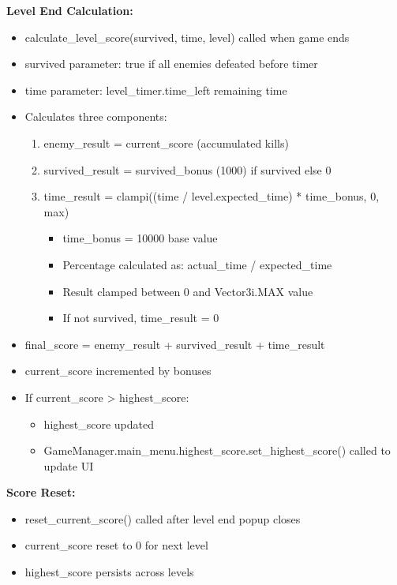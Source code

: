 \documentclass{article}
\begin{document}
\textbf{Level End Calculation:}
\begin{itemize}
    \item calculate\_level\_score(survived, time, level) called when game ends
    \item survived parameter: true if all enemies defeated before timer
    \item time parameter: level\_timer.time\_left remaining time
    \item Calculates three components:
    \begin{enumerate}
        \item enemy\_result = current\_score (accumulated kills)
        \item survived\_result = survived\_bonus (1000) if survived else 0
        \item time\_result = clampi((time / level.expected\_time) * time\_bonus, 0, max)
        \begin{itemize}
            \item time\_bonus = 10000 base value
            \item Percentage calculated as: actual\_time / expected\_time
            \item Result clamped between 0 and Vector3i.MAX value
            \item If not survived, time\_result = 0
        \end{itemize}
    \end{enumerate}
    \item final\_score = enemy\_result + survived\_result + time\_result
    \item current\_score incremented by bonuses
    \item If current\_score > highest\_score:
    \begin{itemize}
        \item highest\_score updated
        \item GameManager.main\_menu.highest\_score.set\_highest\_score() called to update UI
    \end{itemize}
\end{itemize}

\textbf{Score Reset:}
\begin{itemize}
    \item reset\_current\_score() called after level end popup closes
    \item current\_score reset to 0 for next level
    \item highest\_score persists across levels
\end{itemize}
\end{document}
